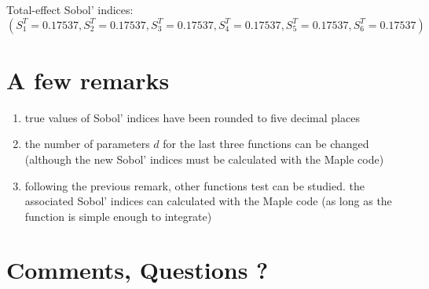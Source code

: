 \documentclass[10pt,a4paper]{article}
\begin{document}
\bigskip

Total-effect Sobol' indices: $$(S_1^T=0.17537,S_2^T=0.17537, S_3^T=0.17537, S_4^T=0.17537, S_5^T=0.17537, S_6^T=0.17537)$$

\bigskip

\section*{A few remarks}

\begin{enumerate}[.]
\item true values of Sobol' indices have been rounded to five decimal places
\item the number of parameters $d$ for the last three functions can be changed (although the new Sobol' indices must be calculated with the Maple code)
\item following the previous remark, other functions test can be studied. the associated Sobol' indices can calculated with the Maple code (as long as the function is simple enough to integrate)
\end{enumerate}

\bigskip

\section*{Comments, Questions ?}
\end{document}
